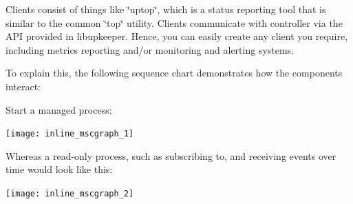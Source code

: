 Clients consist of things like \char`\"{}uptop\char`\"{}, which is a status reporting tool that is similar to the common \char`\"{}top\char`\"{} utility. Clients communicate with controller via the API provided in libupkeeper. Hence, you can easily create any client you require, including metrics reporting and/or monitoring and alerting systems.

To explain this, the following sequence chart demonstrates how the components interact:

Start a managed process:

\begin{center}

\begin{DoxyImageNoCaption}  \mbox{\texttt{[image: inline\_mscgraph\_1]}}
\end{DoxyImageNoCaption}
\end{center}


Whereas a read-\/only process, such as subscribing to, and receiving events over time would look like this:

\begin{center}

\begin{DoxyImageNoCaption}  \mbox{\texttt{[image: inline\_mscgraph\_2]}}
\end{DoxyImageNoCaption}
\end{center}
